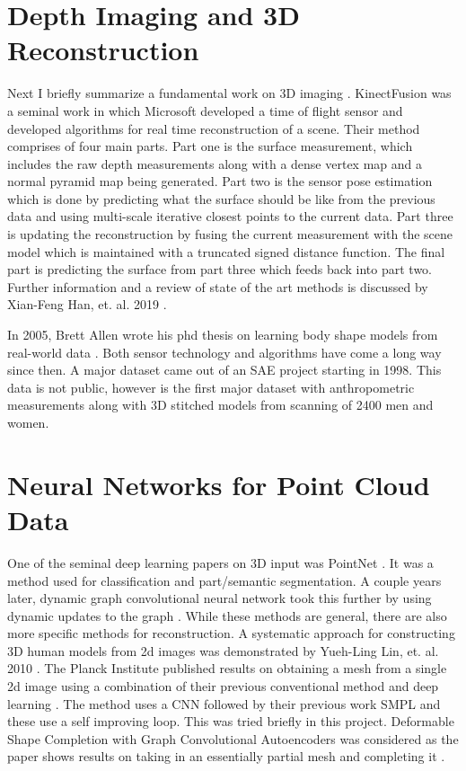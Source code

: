 \section{Depth Imaging and 3D Reconstruction}

Next I briefly summarize a fundamental work on 3D imaging \cite{izadi2011kinectfusion}. KinectFusion was a seminal work in which Microsoft developed a time of flight sensor and developed algorithms for real time reconstruction of a scene. Their method comprises of four main parts. Part one is the surface measurement, which includes the raw depth measurements along with a dense vertex map and a normal pyramid map being generated. Part two is the sensor pose estimation which is done by predicting what the surface should be like from the previous data and using multi-scale iterative closest points to the current data. Part three is updating the reconstruction by fusing the current measurement with the scene model which is maintained with a truncated signed distance function. The final part is predicting the surface from part three which feeds back into part two.
Further information and a review of state of the art methods is discussed by Xian-Feng Han, et. al. 2019 \cite{DBLP:journals/corr/abs-1906-06543}.

In 2005, Brett Allen wrote his phd thesis on learning body shape models from real-world data \cite{allen2005learning}. Both sensor technology and algorithms have come a long way since then. A major dataset came out of an SAE project starting in 1998. This data is not public, however is the first major dataset with anthropometric measurements along with 3D stitched models from scanning of 2400 men and women.

\section{Neural Networks for Point Cloud Data}
One of the seminal deep learning papers on 3D input was PointNet \cite{DBLP:journals/corr/QiSMG16}. It was a method used for classification and part/semantic segmentation. A couple years later, dynamic graph convolutional neural network took this further by using dynamic updates to the graph \cite{DBLP:journals/corr/abs-1801-07829}. While these methods are general, there are also more specific methods for reconstruction. A systematic approach for constructing 3D human models from 2d images was demonstrated by Yueh-Ling Lin, et. al. 2010 \cite{5645897}. The Planck Institute published results on obtaining a mesh from a single 2d image using a combination of their previous conventional method and deep learning \cite{kolotouros2019learning}. The method uses a CNN followed by their previous work SMPL and these use a self improving loop. This was tried briefly in this project. Deformable Shape Completion with Graph Convolutional Autoencoders was considered as the paper shows results on taking in an essentially partial mesh and completing it \cite{litany2018deformable}. 

